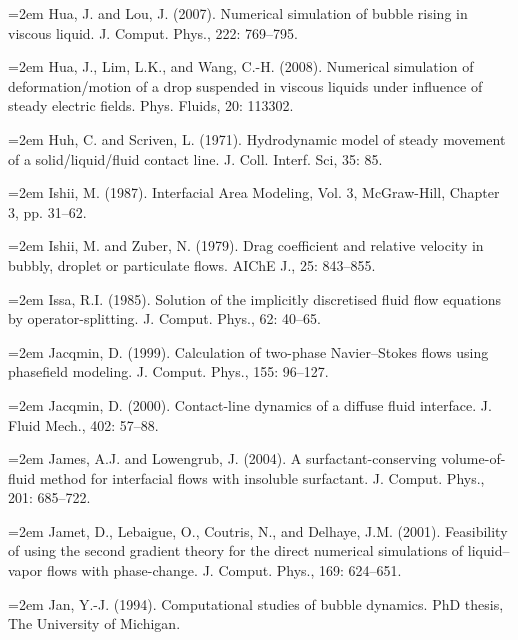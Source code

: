 \documentclass[11pt,a4paper,openany,fontset=none]{ctexbook}
\begin{document}
\par\hangindent=2em Hua, J. and Lou, J. (2007). Numerical simulation of bubble rising in viscous liquid. J. Comput. Phys., 222: 769--795.

\par\hangindent=2em Hua, J., Lim, L.K., and Wang, C.-H. (2008). Numerical simulation of deformation/motion of a drop suspended in viscous liquids under influence of steady electric fields. Phys. Fluids, 20: 113302.

\par\hangindent=2em Huh, C. and Scriven, L. (1971). Hydrodynamic model of steady movement of a solid/liquid/fluid contact line. J. Coll. Interf. Sci, 35: 85.

\par\hangindent=2em Ishii, M. (1987). Interfacial Area Modeling, Vol. 3, McGraw-Hill, Chapter 3, pp. 31--62.

\par\hangindent=2em Ishii, M. and Zuber, N. (1979). Drag coefficient and relative velocity in bubbly, droplet or particulate flows. AIChE J., 25: 843--855.

\par\hangindent=2em Issa, R.I. (1985). Solution of the implicitly discretised fluid flow equations by operator-splitting. J. Comput. Phys., 62: 40--65.

\par\hangindent=2em Jacqmin, D. (1999). Calculation of two-phase Navier--Stokes flows using phasefield modeling. J. Comput. Phys., 155: 96--127.

\par\hangindent=2em Jacqmin, D. (2000). Contact-line dynamics of a diffuse fluid interface. J. Fluid Mech., 402: 57--88.

\par\hangindent=2em James, A.J. and Lowengrub, J. (2004). A surfactant-conserving volume-of-fluid method for interfacial flows with insoluble surfactant. J. Comput. Phys., 201: 685--722.

\par\hangindent=2em Jamet, D., Lebaigue, O., Coutris, N., and Delhaye, J.M. (2001). Feasibility of using the second gradient theory for the direct numerical simulations of liquid--vapor flows with phase-change. J. Comput. Phys., 169: 624--651.


\par\hangindent=2em Jan, Y.-J. (1994). Computational studies of bubble dynamics. PhD thesis, The University of Michigan.
\end{document}
